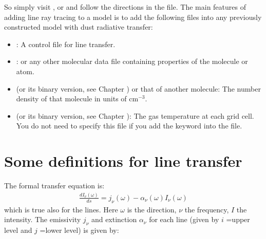 \documentclass[letterpaper,10pt,english]{sphinxmanual}
\begin{document}
So simply visit , 
or  and follow the directions in the  file.
The main features of adding line ray tracing to a model is
to add the following files into any previously constructed model with dust
radiative transfer:
\begin{itemize}
\item {} 
: A control file for line transfer.

\item {} 
: or any other molecular data file
containing properties of the molecule or atom.

\item {} 
 (or its binary version, see Chapter
{\hyperref[\detokenize{binaryio:chap-binary-io}]{}}) or that of another molecule: The number density of
that molecule in units of \(\mathrm{cm}^{-3}\).

\item {} 
 (or its binary version, see Chapter
{\hyperref[\detokenize{binaryio:chap-binary-io}]{}}): The gas temperature at each grid cell. You do not
need to specify this file if you add the keyword 
into the  file.

\end{itemize}


\section{Some definitions for line transfer}
\label{\detokenize{lineradtrans:some-definitions-for-line-transfer}}\label{\detokenize{lineradtrans:sec-line-trans-definitions}}
The formal transfer equation is:
\begin{equation*}
\begin{split}\frac{dI_\nu(\omega)}{ds} = j_\nu(\omega) - \alpha_\nu(\omega)I_\nu(\omega)\end{split}
\end{equation*}
which is true also for the lines. Here \(\omega\) is the direction,
\(\nu\) the frequency, \(I\) the intensity.  The emissivity
\(j_\nu\) and extinction \(\alpha_\nu\) for each line (given by
\(i\) =upper level and \(j\) =lower level) is given by:
\end{document}
